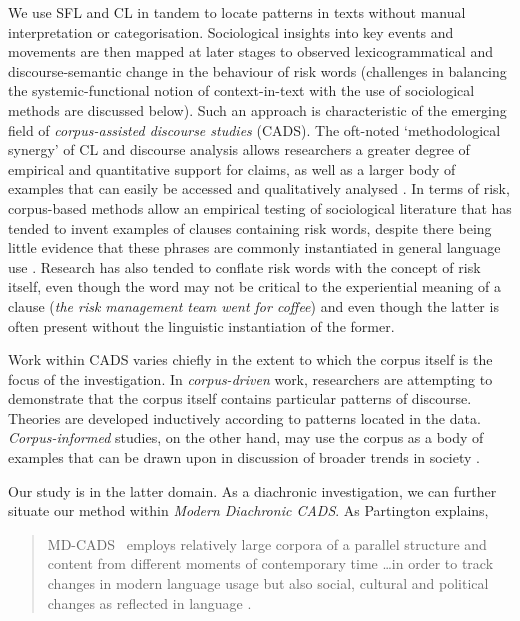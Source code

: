 We use SFL and CL in tandem to locate patterns in texts without manual interpretation or categorisation. Sociological insights into key events and movements are then mapped at later stages to observed lexicogrammatical and discourse-semantic change in the behaviour of risk words (challenges in balancing the systemic-functional notion of context-in-text with the use of sociological methods are discussed below). Such an approach is characteristic of the emerging field of \emph{corpus-assisted discourse studies} (CADS). The oft-noted `methodological synergy' of CL and discourse analysis allows researchers a greater degree of empirical and quantitative support for claims, as well as a larger body of examples that can easily be accessed and qualitatively analysed \cite{baker_useful_2008}. In terms of risk, corpus-based methods allow an empirical testing of sociological literature that has tended to invent examples of clauses containing risk words, despite there being little evidence that these phrases are commonly instantiated in general language use \cite{hamilton_meanings_2007}. Research has also tended to conflate risk words with the concept of risk itself, even though the word may not be critical to the experiential meaning of a clause (\emph{the risk management team went for coffee}) and even though the latter is often present without the linguistic instantiation of the former.

Work within CADS varies chiefly in the extent to which the corpus itself is the focus of the investigation. In \emph{corpus-driven} work, researchers are attempting to demonstrate that the corpus itself contains particular patterns of discourse. Theories are developed inductively according to patterns located in the data. \emph{Corpus-informed} studies, on the other hand, may use the corpus as a body of examples that can be drawn upon in discussion of broader trends in society \cite{baker_useful_2008}.

Our study is in the latter domain.
As a diachronic investigation, we can further situate our method within \emph{Modern Diachronic CADS}. As Partington explains, 

\begin{quote}
\lbrack MD-CADS\rbrack~ employs relatively large corpora of a parallel structure and content from different moments of contemporary time \dots in order to track changes in modern language usage but also social, cultural and political changes as reflected in language \citeyear[p.~83]{partington_modern_2010}.
\end{quote}


